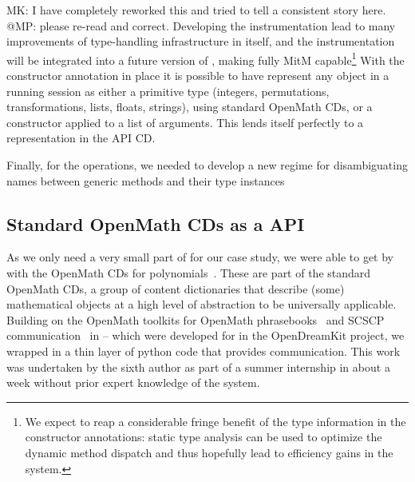 \begin{newpart}{MK: I have completely reworked this and tried to tell a consistent story
    here. @MP: please re-read and correct.}
Developing the instrumentation lead to many improvements of type-handling infrastructure
in \GAP itself, and the instrumentation will be integrated into a future version of \GAP,
making \GAP fully MitM capable\footnote{We expect to reap a considerable fringe benefit of
  the type information in the constructor annotations: static type analysis can be used to
  optimize the dynamic method dispatch and thus hopefully lead to efficiency gains in the
  system.}
With the constructor annotation in place it is possible to have \GAP represent
any object in a running session as either a primitive type (integers,
permutations, transformations, lists, floats, strings), using standard OpenMath
CDs, or a constructor applied to a list of arguments. This lends itself
perfectly to a representation in the \GAP API CD.
 
Finally, for the \GAP operations, we needed to develop a new regime for disambiguating
names between generic methods and their type instances


\subsection{Standard OpenMath CDs as a \Singular API}

As we only need a very small part of \Singular for our case study, we were able to get by
with the OpenMath CDs for polynomials~\cite{OMCD:poly:on}. These are part of the standard
OpenMath CDs, a group of content dictionaries that describe (some) mathematical objects at
a high level of abstraction to be universally applicable. Building on the OpenMath
toolkits for OpenMath phrasebooks~\cite{py-openmath:on} and SCSCP
communication~\cite{py-scscp:on} in \Python -- which were developed for \Sage in the
OpenDreamKit project, we wrapped \Singular in a thin layer of python code that provides
\SCSCP communication. This work was undertaken by the sixth author as part of a summer
internship in about a week without prior expert knowledge of the system.
\end{newpart}

